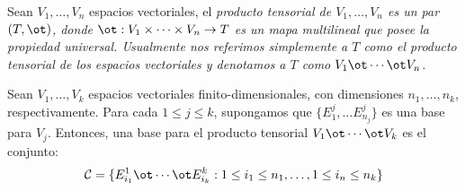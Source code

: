 \begin{definition}
	Sean $V_1, \ldots, V_n$ espacios vectoriales, el \it{producto tensorial} de
	$V_1,\ldots,V_n$ es un par $(T, \ot)$, donde $\ot: V_1 \times \cdots \times
		V_n \to T$ es un mapa multilineal que posee la propiedad universal. Usualmente
	nos referimos simplemente a $T$ como el producto tensorial de los espacios
	vectoriales y denotamos a $T$ como $V_1 \ot \cdots \ot V_n$.
\end{definition}

\begin{theorem}
	\label{Teorema: Base para el producto tensorial}
	Sean $V_1, \ldots, V_k$ espacios vectoriales finito-dimensionales, con
	dimensiones $n_1, \ldots, n_k$, respectivamente. Para cada $1 \leq j \leq k$,
	supongamos que $\{E_{1}^{j}, \ldots E_{n_j}^{j}\}$ es una base para $V_j$.
	Entonces, una base para el producto tensorial $V_1 \ot \cdots \ot V_k$ es
	el conjunto:
	\[
		\mathcal{C} = \{ E_{i_1}^{1} \ot \cdots \ot E_{i_k}^{k} :
		1 \leq i_1 \leq n_1, \ldots, 1 \leq i_n \leq n_k \}
	\]
\end{theorem}

